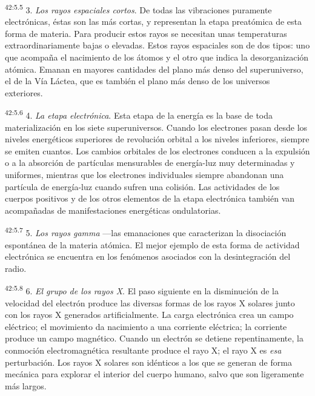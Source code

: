 \par
\textsuperscript{42:5.5} 3. \textit{Los rayos espaciales cortos}. De todas las vibraciones puramente electrónicas, éstas son las más cortas, y representan la etapa preatómica de esta forma de materia. Para producir estos rayos se necesitan unas temperaturas extraordinariamente bajas o elevadas. Estos rayos espaciales son de dos tipos: uno que acompaña el nacimiento de los átomos y el otro que indica la desorganización atómica. Emanan en mayores cantidades del plano más denso del superuniverso, el de la Vía Láctea, que es también el plano más denso de los universos exteriores.

\par
\textsuperscript{42:5.6} 4. \textit{La etapa electrónica}. Esta etapa de la energía es la base de toda materialización en los siete superuniversos. Cuando los electrones pasan desde los niveles energéticos superiores de revolución orbital a los niveles inferiores, siempre se emiten cuantos. Los cambios orbitales de los electrones conducen a la expulsión o a la absorción de partículas mensurables de energía-luz muy determinadas y uniformes, mientras que los electrones individuales siempre abandonan una partícula de energía-luz cuando sufren una colisión. Las actividades de los cuerpos positivos y de los otros elementos de la etapa electrónica también van acompañadas de manifestaciones energéticas ondulatorias.

\par
\textsuperscript{42:5.7} 5. \textit{Los rayos gamma} ---las emanaciones que caracterizan la disociación espontánea de la materia atómica. El mejor ejemplo de esta forma de actividad electrónica se encuentra en los fenómenos asociados con la desintegración del radio.

\par
\textsuperscript{42:5.8} 6. \textit{El grupo de los rayos X}. El paso siguiente en la disminución de la velocidad del electrón produce las diversas formas de los rayos X solares junto con los rayos X generados artificialmente. La carga electrónica crea un campo eléctrico; el movimiento da nacimiento a una corriente eléctrica; la corriente produce un campo magnético. Cuando un electrón se detiene repentinamente, la conmoción electromagnética resultante produce el rayo X; el rayo X es \textit{esa} perturbación. Los rayos X solares son idénticos a los que se generan de forma mecánica para explorar el interior del cuerpo humano, salvo que son ligeramente más largos.

